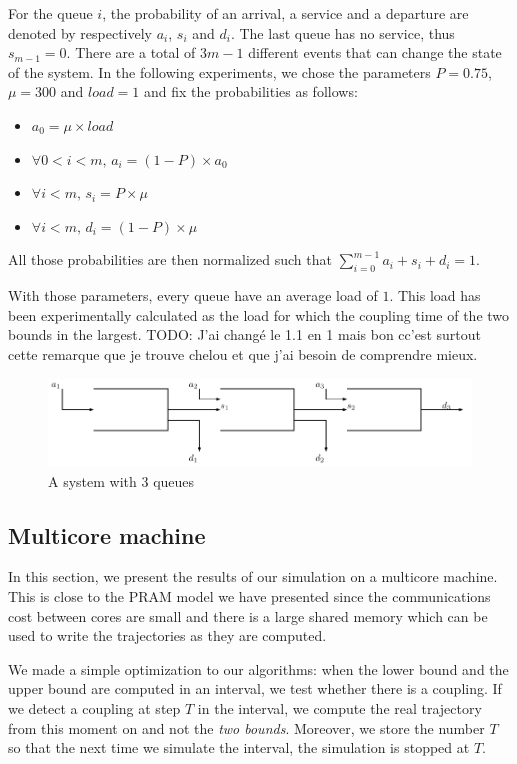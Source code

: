 \documentclass[a4paper,10pt]{article}
\newcommand{\todo}[1]{{\color{red} TODO: {#1}}}
\begin{document}
For the queue $i$, the probability of an arrival, a service and a departure are denoted by respectively $a_i$, $s_i$ and $d_i$. The last queue has no service, thus $s_{m-1} = 0 $. There are a total of $3m-1$ different events that can change the state of the system. In the following experiments, we chose the parameters $P = 0.75$, $\mu = 300$ and $load =1$
and fix the probabilities as follows:
\begin{itemize}
\item $a_0 = \mu \times load$
\item $\forall 0 < i < m, \,a_i = (1-P) \times a_0$
\item $\forall i < m, \,s_i = P \times \mu$
\item $\forall i < m, \,d_i = (1-P) \times \mu$
\end{itemize}

All those probabilities are then normalized such that $\sum\limits_{i=0}^{m-1} a_i + s_i + d_i = 1$.

With those parameters, every queue have an average load of $1$. This load has been experimentally calculated as the load for which the coupling time of the two bounds in the largest. \todo{J'ai changé le 1.1 en 1 mais bon cc'est surtout cette remarque que je trouve chelou et que j'ai besoin de comprendre mieux.}



\begin{figure}[h]
 \includegraphics[scale=0.75]{tandem.pdf}
 \caption{A system with 3 queues}
\end{figure}

\subsection{Multicore machine}

In this section, we present the results of our simulation on a multicore machine.
This is close to the PRAM model we have presented since the communications cost between cores
are small and there is a large shared memory which can be used to write the trajectories as they are computed.


We made a simple optimization to our algorithms: when the lower bound and the upper bound are computed in an interval,
we test whether there is a coupling. If we detect a coupling at step $T$ in the interval, we compute the real trajectory 
from this moment on and not the \emph{two bounds}. Moreover, we store the number $T$ so that the next time we simulate 
the interval, the simulation is stopped at $T$.
 
\end{document}
